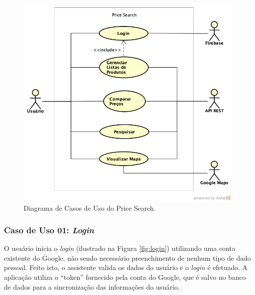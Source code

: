 \begin{figure}[!htb]
\centering
\includegraphics[width=\linewidth]{figuras/DiagramaCasosUsoPriceSearch.png}
\caption{Diagrama de Casos de Uso do Price Search.}
\label{fig:casos-de-uso}
\end{figure}

\subsubsection{Caso de Uso 01: \textit{Login}}

O usuário inicia o \textit{login} (ilustrado na Figura \ref{fig:login}) utilizando uma conta existente do Google, não sendo necessário preenchimento de nenhum tipo de dado pessoal. Feito isto, o assistente valida os dados do usuário e o \textit{login} é efetuado. A aplicação utiliza o ``token'' fornecido pela conta do Google, que é salvo no banco de dados para a sincronização das informações do usuário.

